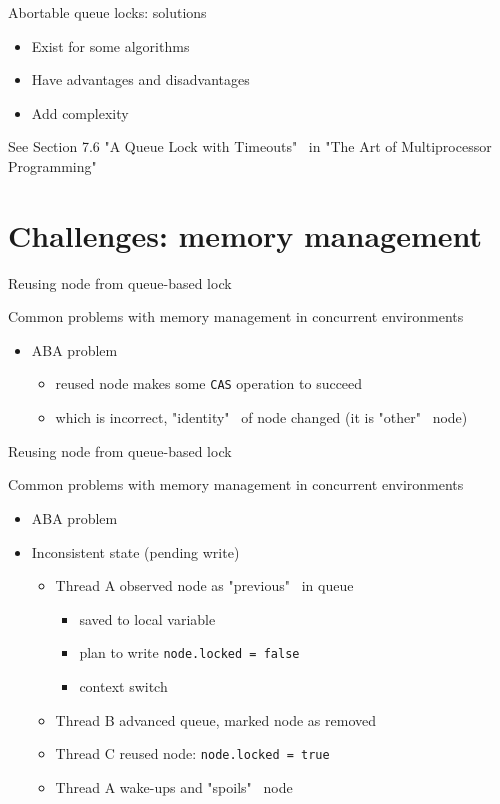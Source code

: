 \begin{frame}[t]{Abortable queue locks: solutions}

\begin{itemize}
  \pause
  \item Exist \pause for some algorithms 
  \pause
  \item Have advantages and disadvantages
  \pause
  \item Add complexity
\end{itemize}

\pause
See Section 7.6 "A Queue Lock with Timeouts" \ in "The Art of Multiprocessor Programming" 

\end{frame}

\section{Challenges: memory management}
\showTOC

\begin{frame}[t]{Reusing node from queue-based lock}

Common problems with memory management in concurrent environments
\begin{itemize}
  \pause \item ABA problem  
  \begin{itemize}
    \pause \item reused node makes some \texttt{CAS} operation to succeed
    \pause \item which is incorrect, "identity" \ of node changed (it is "other" \ node)
  \end{itemize}  
\end{itemize}
\end{frame}

\begin{frame}[t,noframenumbering]{Reusing node from queue-based lock}

Common problems with memory management in concurrent environments
\begin{itemize}
  \item ABA problem  
  \pause \item Inconsistent state (pending write)
  \begin{itemize}
    \pause \item Thread A observed node as "previous" \ in queue
    \begin{itemize}
      \pause \item saved to local variable
      \pause \item plan to write \texttt{node.locked = false}
      \pause \item context switch
     \end{itemize}
    \pause \item Thread B advanced queue, marked node as removed
    \pause \item Thread C reused node: \texttt{node.locked = true}
    \pause \item Thread A wake-ups and "spoils" \ node    
  \end{itemize}
  
\end{itemize}
\end{frame}

